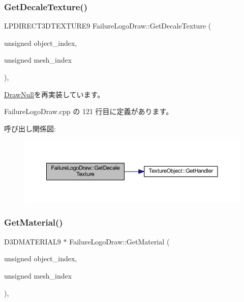 \subsubsection{\texorpdfstring{Get\+Decale\+Texture()}{GetDecaleTexture()}}
{\footnotesize\ttfamily L\+P\+D\+I\+R\+E\+C\+T3\+D\+T\+E\+X\+T\+U\+R\+E9 Failure\+Logo\+Draw\+::\+Get\+Decale\+Texture (\begin{DoxyParamCaption}\item[{unsigned}]{object\+\_\+index,  }\item[{unsigned}]{mesh\+\_\+index }\end{DoxyParamCaption})\hspace{0.3cm}{\ttfamily [override]}, {\ttfamily [virtual]}}



\mbox{\hyperlink{class_draw_null_a8496ed1b1f765a331a8f1704122b8ca4}{Draw\+Null}}を再実装しています。



 Failure\+Logo\+Draw.\+cpp の 121 行目に定義があります。

呼び出し関係図\+:\nopagebreak
\begin{figure}[H]
\begin{center}
\leavevmode
\includegraphics[width=350pt]{class_failure_logo_draw_a2a74fafba17b2f63b1c61abd67289afd_cgraph}
\end{center}
\end{figure}
\mbox{\label{class_failure_logo_draw_aaac019fb396a354ef0f823ed2bd72322}} 
\subsubsection{\texorpdfstring{Get\+Material()}{GetMaterial()}}
{\footnotesize\ttfamily D3\+D\+M\+A\+T\+E\+R\+I\+A\+L9 $\ast$ Failure\+Logo\+Draw\+::\+Get\+Material (\begin{DoxyParamCaption}\item[{unsigned}]{object\+\_\+index,  }\item[{unsigned}]{mesh\+\_\+index }\end{DoxyParamCaption})\hspace{0.3cm}{\ttfamily [override]}, {\ttfamily [virtual]}}



